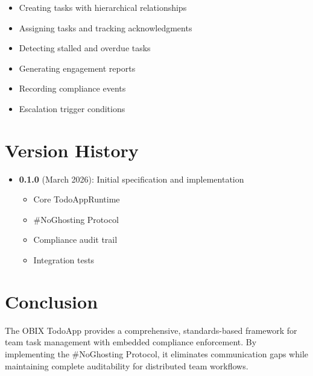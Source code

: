 \documentclass[12pt,a4paper]{article}
\begin{document}
\begin{itemize}
  \item Creating tasks with hierarchical relationships
  \item Assigning tasks and tracking acknowledgments
  \item Detecting stalled and overdue tasks
  \item Generating engagement reports
  \item Recording compliance events
  \item Escalation trigger conditions
\end{itemize}

\section{Version History}

\begin{itemize}
  \item \textbf{0.1.0} (March 2026): Initial specification and implementation
  \begin{itemize}
    \item Core TodoAppRuntime
    \item \#NoGhosting Protocol
    \item Compliance audit trail
    \item Integration tests
  \end{itemize}
\end{itemize}

\section{Conclusion}

The OBIX TodoApp provides a comprehensive, standards-based framework for team task management with embedded compliance enforcement. By implementing the \#NoGhosting Protocol, it eliminates communication gaps while maintaining complete auditability for distributed team workflows.
\end{document}
